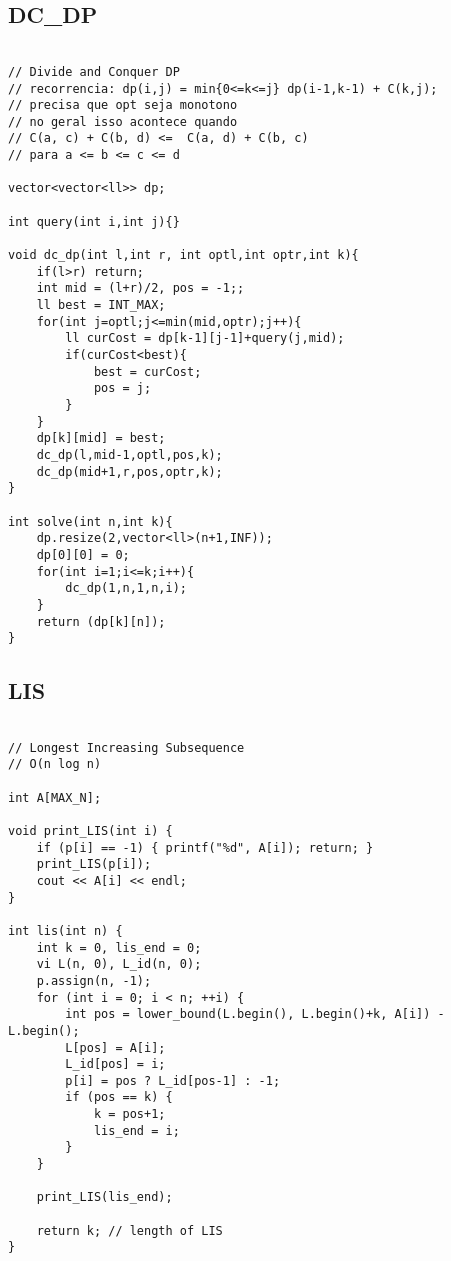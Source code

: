 \documentclass[landscape,twocolumn,10pt,a4paper]{article}
\begin{document}
\subsection{DC_DP}
\begin{verbatim}

// Divide and Conquer DP
// recorrencia: dp(i,j) = min{0<=k<=j} dp(i-1,k-1) + C(k,j);
// precisa que opt seja monotono 
// no geral isso acontece quando 
// C(a, c) + C(b, d) <=  C(a, d) + C(b, c)
// para a <= b <= c <= d

vector<vector<ll>> dp;

int query(int i,int j){}

void dc_dp(int l,int r, int optl,int optr,int k){
    if(l>r) return;
    int mid = (l+r)/2, pos = -1;;
    ll best = INT_MAX;
    for(int j=optl;j<=min(mid,optr);j++){
        ll curCost = dp[k-1][j-1]+query(j,mid);
        if(curCost<best){
            best = curCost;
            pos = j;
        }
    }
    dp[k][mid] = best;
    dc_dp(l,mid-1,optl,pos,k);
    dc_dp(mid+1,r,pos,optr,k);
}

int solve(int n,int k){
    dp.resize(2,vector<ll>(n+1,INF));
    dp[0][0] = 0;
    for(int i=1;i<=k;i++){
        dc_dp(1,n,1,n,i);
    }
    return (dp[k][n]);
}

\end{verbatim}

\subsection{LIS}
\begin{verbatim}

// Longest Increasing Subsequence
// O(n log n)

int A[MAX_N];

void print_LIS(int i) {
    if (p[i] == -1) { printf("%d", A[i]); return; }
    print_LIS(p[i]);
    cout << A[i] << endl;
}

int lis(int n) {
    int k = 0, lis_end = 0;
    vi L(n, 0), L_id(n, 0);
    p.assign(n, -1);
    for (int i = 0; i < n; ++i) {
        int pos = lower_bound(L.begin(), L.begin()+k, A[i]) - L.begin();
        L[pos] = A[i];
        L_id[pos] = i;
        p[i] = pos ? L_id[pos-1] : -1;
        if (pos == k) {
            k = pos+1;
            lis_end = i;
        }
    }

    print_LIS(lis_end);

    return k; // length of LIS
}

\end{verbatim}
\end{document}
